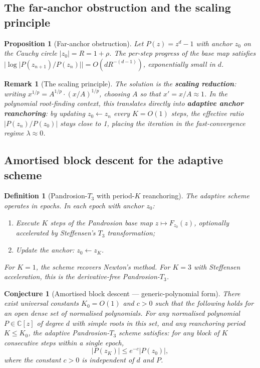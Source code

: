 \documentclass[11pt,a4paper]{article}
\newtheorem{proposition}[theorem]{Proposition}
\newtheorem{conjecture}[theorem]{Conjecture}
\newtheorem{remark}[theorem]{Remark}
\newtheorem{definition}[theorem]{Definition}
\begin{document}
\subsection{The far-anchor obstruction and the scaling principle}

\begin{proposition}[Far-anchor obstruction]
Let $P(z) = z^d - 1$ with anchor $z_0$ on the Cauchy circle $|z_0| = R = 1 + \rho$. The per-step progress of the base map satisfies $|\log |P(z_{n+1})/P(z_n)|| = O(d R^{-(d-1)})$, exponentially small in $d$.
\end{proposition}

\begin{remark}[The scaling principle]
The solution is the \textbf{scaling reduction}: writing $x^{1/p} = A^{1/p} \cdot (x/A)^{1/p}$, choosing $A$ so that $x' = x/A \approx 1$. In the polynomial root-finding context, this translates directly into \textbf{adaptive anchor reanchoring}: by updating $z_0 \leftarrow z_n$ every $K = O(1)$ steps, the effective ratio $|P(z_n)/P(z_0)|$ stays close to 1, placing the iteration in the fast-convergence regime $\lambda \approx 0$.
\end{remark}

\subsection{Amortised block descent for the adaptive scheme}

\begin{definition}[Pandrosion-$T_3$ with period-$K$ reanchoring]
The adaptive scheme operates in epochs. In each epoch with anchor $z_0$:
\begin{enumerate}
\item Execute $K$ steps of the Pandrosion base map $z \mapsto F_{z_0}(z)$, optionally accelerated by Steffensen's $T_3$ transformation;
\item Update the anchor: $z_0 \leftarrow z_K$.
\end{enumerate}
For $K = 1$, the scheme recovers Newton's method. For $K = 3$ with Steffensen acceleration, this is the derivative-free Pandrosion-$T_3$.
\end{definition}

\begin{conjecture}[Amortised block descent --- generic-polynomial form]\label{conj:abd}
There exist universal constants $K_0 = O(1)$ and $c > 0$ such that the following holds for an open dense set of normalised polynomials. For any normalised polynomial $P \in \mathbb{C}[z]$ of degree $d$ with simple roots in this set, and any reanchoring period $K \le K_0$, the adaptive Pandrosion-$T_3$ scheme satisfies: for any block of $K$ consecutive steps within a single epoch,
\begin{equation}
|P(z_K)| \le e^{-c} |P(z_0)|,
\end{equation}
where the constant $c > 0$ is independent of $d$ and $P$.
\end{conjecture}
\end{document}
